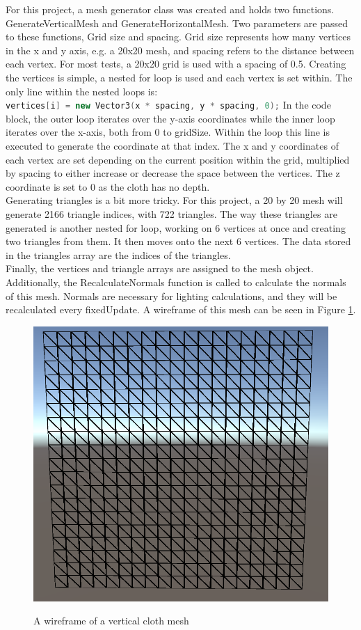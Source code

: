 \documentclass[12pt,a4paper]{article}
\begin{document}
For this project, a mesh generator class was created and holds two functions. GenerateVerticalMesh and GenerateHorizontalMesh. Two parameters are passed to these functions, Grid size and spacing. Grid size represents how many vertices in the x and y axis, e.g. a 20x20 mesh, and spacing refers to the distance between each vertex. For most tests, a 20x20 grid is used with a spacing of 0.5. Creating the vertices is simple, a nested for loop is used and each vertex is set within. The only line within the nested loops is:\\ \lstinline[language=C++]!vertices[i] = new Vector3(x * spacing, y * spacing, 0);!
In the code block, the outer loop iterates over the y-axis coordinates while the inner loop iterates over the x-axis, both from 0 to gridSize. Within the loop this line is executed to generate the coordinate at that index. The x and y coordinates of each vertex are set depending on the current position within the grid, multiplied by spacing to either increase or decrease the space between the vertices. The z coordinate is set to 0 as the cloth has no depth.\\

Generating triangles is a bit more tricky. For this project, a 20 by 20 mesh will generate 2166 triangle indices, with 722 triangles. The way these triangles are generated is another nested for loop, working on 6 vertices at once and creating two triangles from them. It then moves onto the next 6 vertices. The data stored in the triangles array are the indices of the triangles. \\

Finally, the vertices and triangle arrays are assigned to the mesh object. Additionally, the RecalculateNormals function is called to calculate the normals of this mesh. Normals are necessary for lighting calculations, and they will be recalculated every fixedUpdate. A wireframe of this mesh can be seen in Figure \ref{fig:mesh}.
\begin{figure}
	\centering
	\caption{A wireframe of a vertical cloth mesh}
	\includegraphics[scale=0.5]{clothmesh.png}
	\label{fig:mesh}
\end{figure}
\end{document}
